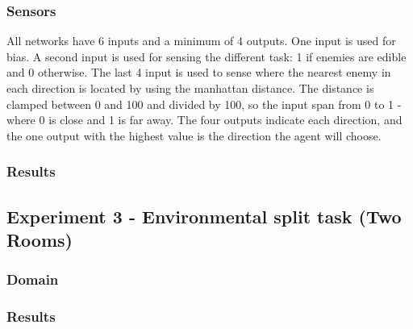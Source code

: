 \documentclass[11pt, a4paper]{article}
\begin{document}
\subsubsection{Sensors}
All networks have 6 inputs and a minimum of 4 outputs. One input is used for bias. A second input is used for sensing the different task: 1 if enemies are edible and 0 otherwise. The last 4 input is used to sense where the nearest enemy in each direction is located by using the manhattan distance. The distance is clamped between 0 and 100 and divided by 100, so the input span from 0 to 1 - where 0 is close and 1 is far away. The four outputs indicate each direction, and the one output with the highest value is the direction the agent will choose.
\subsubsection{Results}
\subsection{Experiment 3 - Environmental split task (Two Rooms)}
\subsubsection{Domain}
\subsubsection{Results}
\end{document}
